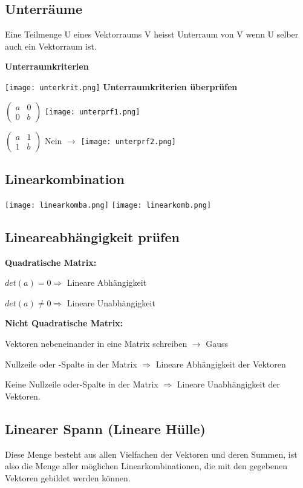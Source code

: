 \begin{multicols*}{3}
    \subsection{Unterräume}
    {Eine Teilmenge U eines Vektorraums V heisst Unterraum von V wenn U selber auch ein Vektorraum ist.}

    {\textbf{Unterraumkriterien}}

    \texttt{[image: unterkrit.png]}
    {\textbf{Unterraumkriterien überprüfen} }

    {$ \begin{pmatrix}
                a & 0 \\
                0 & b
            \end{pmatrix} $
        \texttt{[image: unterprf1.png]}}

    {$ \begin{pmatrix}
                a & 1 \\
                1 & b
            \end{pmatrix} $
        {Nein $\rightarrow$}
        \texttt{[image: unterprf2.png]}}







    \subsection{Linearkombination}
    {\texttt{[image: linearkomba.png]}}
    {\texttt{[image: linearkomb.png]}}
    \subsection{Lineareabhängigkeit prüfen}
    {\textbf{Quadratische Matrix:} }

    {$det(a) = 0 \Rightarrow$ Lineare Abhängigkeit}

    {$det(a) \neq 0 \Rightarrow$  Lineare Unabhängigkeit}

    {\textbf{Nicht Quadratische Matrix:} }

    { Vektoren nebeneinander in eine Matrix schreiben $\rightarrow$ Gauss  }

    { {\small Nullzeile oder -Spalte in der Matrix} $\Longrightarrow$ Lineare Abhängigkeit der Vektoren}

    { {\small Keine Nullzeile oder-Spalte in der Matrix} $\Longrightarrow$ Lineare Unabhängigkeit der Vektoren.}
    \subsection{Linearer Spann (Lineare Hülle)}
    {Diese Menge besteht aus allen Vielfachen der Vektoren und deren Summen, ist also die Menge aller möglichen Linearkombinationen, die mit den gegebenen Vektoren gebildet werden können.}


\end{multicols*}
